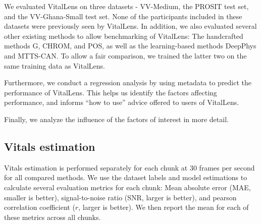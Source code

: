 \documentclass{article}
\begin{document}
We evaluated VitalLens on three datasets - VV-Medium, the PROSIT test set, and the VV-Ghana-Small test set.
None of the participants included in these datasets were previously seen by VitalLens.
In addition, we also evaluated several other existing methods to allow benchmarking of VitalLens:
The handcrafted methods G, CHROM, and POS, as well as the learning-based methods DeepPhys and MTTS-CAN.
To allow a fair comparison, we trained the latter two on the same training data as VitalLens.

Furthermore, we conduct a regression analysis by using metadata to predict the performance of VitalLens.
This helps us identify the factors affecting performance, and informs ``how to use'' advice offered to users of VitalLens.

Finally, we analyze the influence of the factors of interest in more detail.

\subsection{Vitals estimation}

Vitals estimation is performed separately for each chunk at 30 frames per second for all compared methods.
We use the dataset labels and model estimations to calculate several evaluation metrics for each chunk:
Mean absolute error (MAE, smaller is better), signal-to-noise ratio (SNR, larger is better), and pearson correlation coefficient ($r$, larger is better).
We then report the mean for each of these metrics across all chunks.

\newcommand{\printMetric}[1]{%
  \ifthenelse{\equal{#1}{0.0}}%
    {--}%
    {\sisetup{round-mode=places,round-precision=2}\num{#1}}%
}
\end{document}
